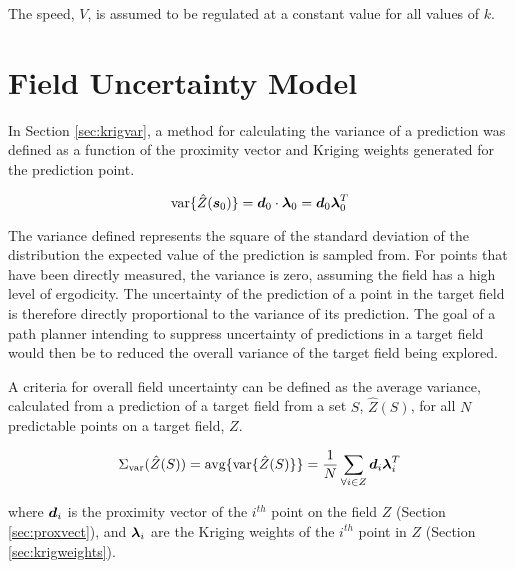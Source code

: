 The speed, $V$, is assumed to be regulated at a constant value for all values of $k$.

\section{Field Uncertainty Model} \label{sec:fielduncert}
In Section \ref{sec:krigvar}, a method for calculating the variance of a prediction was defined as a function of the proximity vector and Kriging weights generated for the prediction point.

\begin{equation}
    \text{var}\{\hat{Z}({\it{\boldsymbol{s}}}_0)\} = {\it{\boldsymbol{d}}}_0 \cdot {\it{\boldsymbol{\lambda}}}_0 = {\it{\boldsymbol{d}}}_0 {\it{\boldsymbol{\lambda}}}_0^T
\end{equation}

The variance defined represents the square of the standard deviation of the distribution the expected value of the prediction is sampled from. For points that have been directly measured, the variance is zero, assuming the field has a high level of ergodicity. The uncertainty of the prediction of a point in the target field is therefore directly proportional to the variance of its prediction. The goal of a path planner intending to suppress uncertainty of predictions in a target field would then be to reduced the overall variance of the target field being explored.

A criteria for overall field uncertainty can be defined as the average variance, calculated from a prediction of a target field from a set $S$, $\hat{Z}(S)$, for all $N$ predictable points on a target field, $Z$.

\begin{equation}
	\Sigma_{\text{var}}(\hat{Z}(S)) = \text{avg}\{{\text{var}\{\hat{Z}(S)\}}\} = \frac{1}{N}\sum_{\forall i \in Z} {\it{\boldsymbol{d}}}_i {\it{\boldsymbol{\lambda}}}_i^T
	\label{eq:fielduncert}
\end{equation}

\noindent where ${\it{\boldsymbol{d}}}_i$ is the proximity vector of the $i^{th}$ point on the field $Z$ (Section \ref{sec:proxvect}), and ${\it{\boldsymbol{\lambda}}}_i$ are the Kriging weights of the $i^{th}$ point in $Z$ (Section \ref{sec:krigweights}).